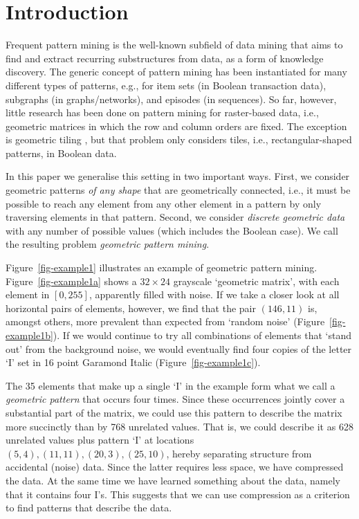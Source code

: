 \documentclass{llncs}
\begin{document}
\section{Introduction}

Frequent pattern mining \cite{aggarwal2014fpm} is the well-known subfield of data mining that aims to find and extract recurring substructures from data, as a form of knowledge discovery. The generic concept of pattern mining has been instantiated for many different types of patterns, e.g., for item sets (in Boolean transaction data), subgraphs (in graphs/networks), and episodes (in sequences). So far, however, little research has been done on pattern mining for raster-based data, i.e., geometric matrices in which the row and column orders are fixed. The exception is geometric tiling \cite{gionis2004tiles,tatti2012stijl}, but that problem only considers tiles, i.e., rectangular-shaped patterns, in Boolean data.

In this paper we generalise this setting in two important ways. First, we consider geometric patterns \emph{of any shape} that are geometrically connected, i.e., it must be possible to reach any element from any other element in a pattern by only traversing elements in that pattern. Second, we consider \emph{discrete geometric data} with any number of possible values (which includes the Boolean case). We call the resulting problem \emph{geometric pattern mining}.

Figure~\ref{fig-example1} illustrates an example of geometric pattern mining.  Figure~\ref{fig-example1a} shows a $32 \times 24$ grayscale `geometric matrix', with each element in $[0,255]$, apparently filled with noise. If we take a closer look at all horizontal pairs of elements, however, we find that the pair $(146,11)$ is, amongst others, more prevalent than expected from `random noise' (Figure~\ref{fig-example1b}). If we would continue to try all combinations of elements that `stand out' from the background noise, we would eventually find four copies of the letter `I' set in 16 point Garamond Italic (Figure~\ref{fig-example1c}).

The 35 elements that make up a single `I' in the example form what we call a \emph{geometric pattern} that occurs four times. Since these occurrences jointly cover a substantial part of the matrix, we could use this pattern to describe the matrix more succinctly than by 768 unrelated values. That is, we could describe it as 628 unrelated values plus pattern `I' at locations $(5,4), (11,11), (20,3), (25,10)$, hereby separating structure from accidental (noise) data. Since the latter requires less space, we have compressed the data. At the same time we have learned something about the data, namely that it contains four I's. This suggests that we can use compression as a criterion to find patterns that describe the data.
\end{document}
